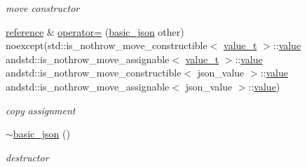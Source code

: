 \begin{DoxyCompactItemize}
\begin{DoxyCompactList}\small\item\em move constructor \end{DoxyCompactList}\item 
\hyperlink{classnlohmann_1_1basic__json_a3ec8e17be8732fe436e9d6733f52b7a3}{reference} \& \hyperlink{classnlohmann_1_1basic__json_aa2dd4722bc4e87b0738c90a1352bf213}{operator=} (\hyperlink{classnlohmann_1_1basic__json}{basic\-\_\-json} other) noexcept(std\-::is\-\_\-nothrow\-\_\-move\-\_\-constructible$<$ \hyperlink{classnlohmann_1_1basic__json_a231b02148577b69a154b2ce2c87a5522}{value\-\_\-t} $>$\-::\hyperlink{classnlohmann_1_1basic__json_a0a2cbbd95862a623e7dc5c37e67dead0}{value} andstd\-::is\-\_\-nothrow\-\_\-move\-\_\-assignable$<$ \hyperlink{classnlohmann_1_1basic__json_a231b02148577b69a154b2ce2c87a5522}{value\-\_\-t} $>$\-::\hyperlink{classnlohmann_1_1basic__json_a0a2cbbd95862a623e7dc5c37e67dead0}{value} andstd\-::is\-\_\-nothrow\-\_\-move\-\_\-constructible$<$ json\-\_\-value $>$\-::\hyperlink{classnlohmann_1_1basic__json_a0a2cbbd95862a623e7dc5c37e67dead0}{value} andstd\-::is\-\_\-nothrow\-\_\-move\-\_\-assignable$<$ json\-\_\-value $>$\-::\hyperlink{classnlohmann_1_1basic__json_a0a2cbbd95862a623e7dc5c37e67dead0}{value})
\begin{DoxyCompactList}\small\item\em copy assignment \end{DoxyCompactList}\item 
\hyperlink{classnlohmann_1_1basic__json_a947b5b2a832e490858dbdddfe7085831}{$\sim$basic\-\_\-json} ()
\begin{DoxyCompactList}\small\item\em destructor \end{DoxyCompactList}\end{DoxyCompactItemize}
